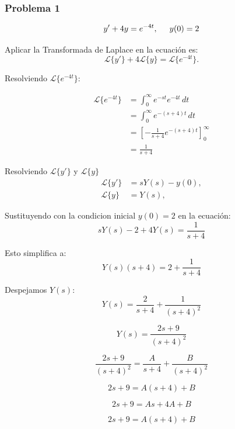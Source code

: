 \documentclass{article}
\begin{document}
\subsubsection{Problema 1}
\[y' + 4y = e^{-4t}, \hspace{.5cm} y(0) = 2\]

Aplicar la Transformada de Laplace en la ecuación es:
\begin{equation*}
    \mathcal{L}\{y'\} + 4\mathcal{L}\{y\} = \mathcal{L}\{e^{-4t}\}.
\end{equation*}

Resolviendo $\mathcal{L}\{e^{-4t}\}$:

\begin{align*}
    \mathcal{L}\{e^{-4t}\} & = \int_0^\infty e^{-st}e^{-4t}\,dt                  \\
                           & = \int_0^\infty e^{-(s+4)t}\,dt                     \\
                           & = \left[ -\frac{1}{s+4}e^{-(s+4)t} \right]_0^\infty \\
                           & = \frac{1}{s + 4}
\end{align*}

Resolviendo $\mathcal{L}\{y'\}$ y $\mathcal{L}\{y\}$
\begin{align*}
    \mathcal{L}\{y'\} & = sY(s) - y(0), \\
    \mathcal{L}\{y\}  & = Y(s),
\end{align*}

Sustituyendo con la condicion inicial \(y(0) = 2\) en la ecuación:
\begin{equation*}
    sY(s) - 2 + 4Y(s) = \frac{1}{s + 4}
\end{equation*}

Esto simplifica a:
\begin{equation*}
    Y(s)(s + 4) = 2 + \frac{1}{s + 4}
\end{equation*}

Despejamos \(Y(s)\):
\begin{equation*}
    Y(s) = \frac{2}{s + 4} + \frac{1}{(s + 4)^2}
\end{equation*}

\[
    Y(s) = \frac{2s+9}{(s + 4)^2}
\]

\[\frac{2s+9}{(s + 4)^2} = \frac{A}{s+4} + \frac{B}{(s+4)^2}\]

\[2s+9 = A(s+4) + B\]

\[2s+9 = As+4A + B\]

\[2s+9 = A(s+4) + B\]
\end{document}
